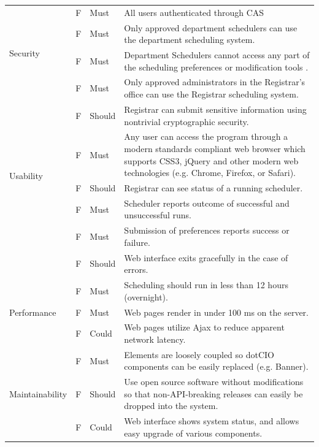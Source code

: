 \documentclass[11pt]{article}
\newcounter{id}
\newcommand{\specid}{\arabic{id}\stepcounter{id}}
\begin{document}
\begin{longtable}{|m{1in}|m{0.3in}|m{0.6in}|m{4.5in}|}
\multirow{4}{*}{Security }
 &  F\specid & Must
 & All users authenticated through CAS \\  \cline{2-4}
 & F\specid & Must
 & Only approved department schedulers can use the department scheduling system. \\  \cline{2-4}
 & F\specid & Must
 &Department Schedulers cannot access any part of the scheduling preferences or modification tools . \\  \cline{2-4}
 &F\specid & Must
 & Only approved administrators in the Registrar's office can use the Registrar scheduling system. \\  \cline{2-4}
 &F\specid & Should
 & Registrar can submit sensitive information using nontrivial cryptographic security. \\  \hline\hline


\multirow{3}{*}{Usability }
 & F\specid & Must
 & Any user can access the program through a modern standards compliant web browser which supports CSS3, jQuery and other modern web technologies (e.g. Chrome, Firefox, or Safari). \\  \cline{2-4}
 & F\specid & Should
 & Registrar can see status of a running scheduler. \\ \hline\hline

\multirow{3}{*}{Reliability }

 &F\specid & Must
 & Scheduler reports outcome of successful and unsuccessful runs. \\  \cline{2-4}
 & F\specid & Must
 & Submission of preferences reports success or failure. \\\cline{2-4}
 & F\specid & Should
 & Web interface exits gracefully in the case of errors. \\   \hline \hline

\multirow{3}{*}{Performance }
 & F\specid & Must
 & Scheduling should run in less than 12 hours (overnight). \\  \cline{2-4}
 &F\specid & Must
 & Web pages render in under 100 ms on the server. \\  \cline{2-4}
 & F\specid & Could
 & Web pages utilize Ajax to reduce apparent network latency. \\ \hline\hline

\multirow{3}{*}{Maintainability}
 & F\specid & Must
 &  Elements are loosely coupled so dotCIO components can be easily replaced (e.g. Banner).\\  \cline{2-4}
 &F\specid & Should
 & Use open source software without modifications so that non-API-breaking releases can easily be dropped into the system. \\  \cline{2-4}
 & F\specid & Could
 & Web interface shows system status, and allows easy upgrade of various components. \\ \hline


\end{longtable}
\end{document}
